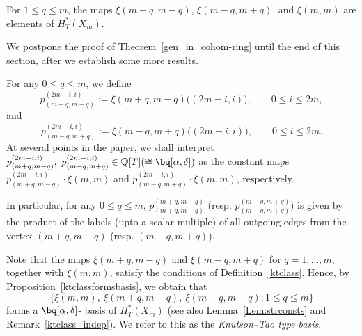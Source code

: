 \documentclass[10pt, a4paper, reqno]{amsart}
\begin{document}
\begin{guess}\label{gen_in_cohom-ring}
For $1 \leq q \leq m$, the maps $\xi(m+q,m-q)$, $\xi(m-q,m+q)$, and $\xi(m,m)$ are elements of $H_T^*(X_m)$.
\end{guess}
We postpone the proof of Theorem~\ref{gen_in_cohom-ring} until the end of this section, after we establish some more results.

\begin{defe}\label{Def:p^_}
	For any $0 \leq q \leq m$, we define
	\[
	p_{(m+q,m-q)}^{(2m-i,i)} := \xi(m+q,m-q)\big((2m-i,i)\big), \qquad 0 \leq i \leq 2m,
	\]
	and
	\[
	p_{(m-q,m+q)}^{(2m-i,i)} := \xi(m-q,m+q)\big((2m-i,i)\big), \qquad 0 \leq i \leq 2m.
	\]
At several points in the paper, we shall interpret 
$p_{(m+q,m-q)}^{(2m-i,i)},~p_{(m-q,m+q)}^{(2m-i,i)} \in \mathbb{Q}[T] (\cong\bq[\alpha,\delta])$ 
as the constant maps 
$p_{(m+q,m-q)}^{(2m-i,i)} \cdot \xi(m,m)$ 
and 
$p_{(m-q,m+q)}^{(2m-i,i)} \cdot \xi(m,m)$, 
respectively.
\end{defe}


\begin{rema}\label{prod_of_edge_label}
	In particular, for any $0\leq q\leq m$,  $p_{(m+q,m-q)}^{(m+q,m-q)}$ (resp. $p_{(m-q,m+q)}^{(m-q,m+q)}$) is given by the product of the labels (upto a scalar multiple) of all outgoing edges  from the vertex $(m+q,m-q)$ (resp. $(m-q,m+q)$).
\end{rema}

Note that the maps $\xi(m+q,m-q)$ and $\xi(m-q,m+q)$ for $q = 1, \ldots, m$, together with $\xi(m,m)$, satisfy the conditions of Definition~\ref{ktclass}. 
Hence, by Proposition~\ref{ktclassformsbasis}, we obtain that  
\[
\Big\{\xi(m,m),~\xi(m+q,m-q),~\xi(m-q,m+q) : 1 \le q \le m\Big\}
\]
forms a $\bq[\alpha,\delta]$- basis of $H_T^*(X_m)$ (see also Lemma~\ref{Lem:strconsts} and Remark~\ref{ktclass_indep}). 
We refer to this as the \emph{Knutson--Tao type basis}.
\end{document}
